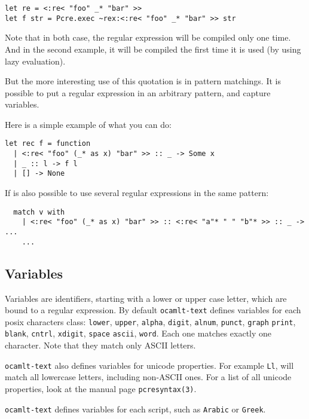 \documentclass{article}
\newcommand{\oct}{\texttt{ocamlt-text}\xspace}
\begin{document}
\lstset{language=[Objective]Caml}\begin{lstlisting}
let re = <:re< "foo" _* "bar" >>
let f str = Pcre.exec ~rex:<:re< "foo" _* "bar" >> str
\end{lstlisting}

Note that in both case, the regular expression will be compiled only
one time. And in the second example, it will be compiled the first
time it is used (by using lazy evaluation).

But the more interesting use of this quotation is in pattern
matchings. It is possible to put a regular expression in an arbitrary
pattern, and capture variables.

Here is a simple example of what you can do:

\lstset{language=[Objective]Caml}\begin{lstlisting}
let rec f = function
  | <:re< "foo" (_* as x) "bar" >> :: _ -> Some x
  | _ :: l -> f l
  | [] -> None
\end{lstlisting}

If is also possible to use several regular expressions in the same
pattern:

\lstset{language=[Objective]Caml}\begin{lstlisting}
  match v with
    | <:re< "foo" (_* as x) "bar" >> :: <:re< "a"* " " "b"* >> :: _ -> ...
    ...
\end{lstlisting}

\subsection{Variables}

Variables are identifiers, starting with a lower or upper case letter,
which are bound to a regular expression. By default \oct defines
variables for each posix characters class: \texttt{lower},
\texttt{upper}, \texttt{alpha}, \texttt{digit}, \texttt{alnum},
\texttt{punct}, \texttt{graph} \texttt{print}, \texttt{blank},
\texttt{cntrl}, \texttt{xdigit}, \texttt{space} \texttt{ascii},
\texttt{word}. Each one matches exactly one character. Note that they
match only ASCII letters.

\oct also defines variables for unicode properties. For example
\texttt{Ll}, will match all lowercase letters, including non-ASCII
ones. For a list of all unicode properties, look at the manual page
\texttt{pcresyntax(3)}.

\oct defines variables for each script, such as \texttt{Arabic} or
\texttt{Greek}.
\end{document}

